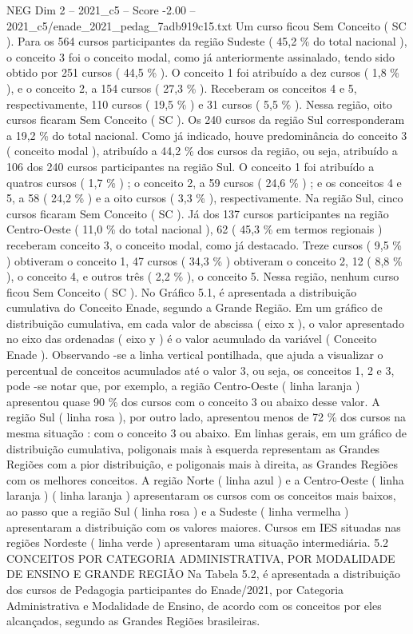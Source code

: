\begin{textsample}{NEG Dim 2 – 2021\_c5 – Score -2.00 – 2021\_c5/enade\_2021\_pedag\_7adb919c15.txt}
Um curso ficou Sem Conceito ( SC ).
Para os 564 cursos participantes da região Sudeste ( 45,2 \% do total nacional ), o conceito 3 foi o conceito modal, como já anteriormente assinalado, tendo sido obtido por 251 cursos ( 44,5 \% ).
O conceito 1 foi atribuído a dez cursos ( 1,8 \% ), e o conceito 2, a 154 cursos ( 27,3 \% ).
Receberam os conceitos 4 e 5, respectivamente, 110 cursos ( 19,5 \% ) e 31 cursos ( 5,5 \% ).
Nessa região, oito cursos ficaram Sem Conceito ( SC ).
Os 240 cursos da região Sul corresponderam a 19,2 \% do total nacional.
Como já indicado, houve predominância do conceito 3 ( conceito modal ), atribuído a 44,2 \% dos cursos da região, ou seja, atribuído a 106 dos 240 cursos participantes na região Sul.
O conceito 1 foi atribuído a quatros cursos ( 1,7 \% ) ; o conceito 2, a 59 cursos ( 24,6 \% ) ; e os conceitos 4 e 5, a 58 ( 24,2 \% ) e a oito cursos ( 3,3 \% ), respectivamente.
Na região Sul, cinco cursos ficaram Sem Conceito ( SC ).
Já dos 137 cursos participantes na região Centro-Oeste ( 11,0 \% do total nacional ), 62 ( 45,3 \% em termos regionais ) receberam conceito 3, o conceito modal, como já destacado.
Treze cursos ( 9,5 \% ) obtiveram o conceito 1, 47 cursos ( 34,3 \% ) obtiveram o conceito 2, 12 ( 8,8 \% ), o conceito 4, e outros três ( 2,2 \% ), o conceito 5.
Nessa região, nenhum curso ficou Sem Conceito ( SC ).
No Gráfico 5.1, é apresentada a distribuição cumulativa do Conceito Enade, segundo a Grande Região.
Em um gráfico de distribuição cumulativa, em cada valor de abscissa ( eixo x ), o valor apresentado no eixo das ordenadas ( eixo y ) é o valor acumulado da variável ( Conceito Enade ).
Observando -se a linha vertical pontilhada, que ajuda a visualizar o percentual de conceitos acumulados até o valor 3, ou seja, os conceitos 1, 2 e 3, pode -se notar que, por exemplo, a região Centro-Oeste ( linha laranja ) apresentou quase 90 \% dos cursos com o conceito 3 ou abaixo desse valor.
A região Sul ( linha rosa ), por outro lado, apresentou menos de 72 \% dos cursos na mesma situação : com o conceito 3 ou abaixo.
Em linhas gerais, em um gráfico de distribuição cumulativa, poligonais mais à esquerda representam as Grandes Regiões com a pior distribuição, e poligonais mais à direita, as Grandes Regiões com os melhores conceitos.
A região Norte ( linha azul ) e a Centro-Oeste ( linha laranja ) ( linha laranja ) apresentaram os cursos com os conceitos mais baixos, ao passo que a região Sul ( linha rosa ) e a Sudeste ( linha vermelha ) apresentaram a distribuição com os valores maiores.
Cursos em IES situadas nas regiões Nordeste ( linha verde ) apresentaram uma situação intermediária. 5.2 CONCEITOS POR CATEGORIA ADMINISTRATIVA, POR MODALIDADE DE ENSINO E GRANDE REGIÃO Na Tabela 5.2, é apresentada a distribuição dos cursos de Pedagogia participantes do Enade/2021, por Categoria Administrativa e Modalidade de Ensino, de acordo com os conceitos por eles alcançados, segundo as Grandes Regiões brasileiras.

\end{textsample}
